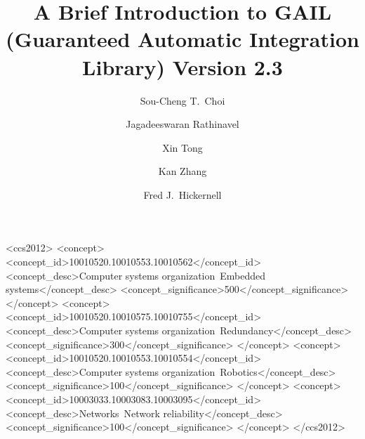 \documentclass[acmtog, authorversion]{acmart}
\begin{document}
\title{A Brief Introduction to GAIL ({\sc Guaranteed Automatic Integration Library}) Version 2.3}

\author{Sou-Cheng T.~Choi}
\author{Jagadeeswaran Rathinavel}
\author{Xin Tong}
\author{Kan Zhang}
\author{Fred J.~Hickernell}

\renewcommand\shortauthors{Choi, S.-C. et al}


 


%
%
\begin{CCSXML}
<ccs2012>
 <concept>
  <concept_id>10010520.10010553.10010562</concept_id>
  <concept_desc>Computer systems organization~Embedded systems</concept_desc>
  <concept_significance>500</concept_significance>
 </concept>
 <concept>
  <concept_id>10010520.10010575.10010755</concept_id>
  <concept_desc>Computer systems organization~Redundancy</concept_desc>
  <concept_significance>300</concept_significance>
 </concept>
 <concept>
  <concept_id>10010520.10010553.10010554</concept_id>
  <concept_desc>Computer systems organization~Robotics</concept_desc>
  <concept_significance>100</concept_significance>
 </concept>
 <concept>
  <concept_id>10003033.10003083.10003095</concept_id>
  <concept_desc>Networks~Network reliability</concept_desc>
  <concept_significance>100</concept_significance>
 </concept>
</ccs2012>
\end{CCSXML}
\end{document}
